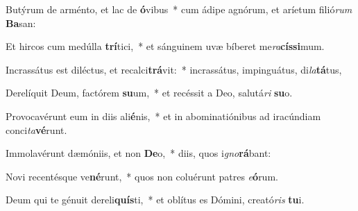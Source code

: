 \item Butýrum de arménto, et lac de \textbf{ó}vibus~* cum ádipe agnórum, et aríetum filió\textit{rum} \textbf{Ba}san:
\item Et hircos cum medúlla \textbf{trí}tici,~* et sánguinem uvæ bíberet me\textit{ra}\textbf{cís}\textbf{si}mum.
\item Incrassátus est diléctus, et recalci\textbf{trá}vit:~* incrassátus, impinguátus, di\textit{la}\textbf{tá}tus,
\item Derelíquit Deum, factórem \textbf{su}um,~* et recéssit a Deo, salutá\textit{ri} \textbf{su}o.
\item Provocavérunt eum in diis ali\textbf{é}nis,~* et in abominatiónibus ad iracúndiam conci\textit{ta}\textbf{vé}runt.
\item Immolavérunt dæmóniis, et non \textbf{De}o,~* diis, quos i\textit{gno}\textbf{rá}bant:
\item Novi recentésque ve\textbf{né}runt,~* quos non coluérunt patres \textit{e}\textbf{ó}rum.
\item Deum qui te génuit dereli\textbf{quís}ti,~* et oblítus es Dómini, creató\textit{ris} \textbf{tu}i.
